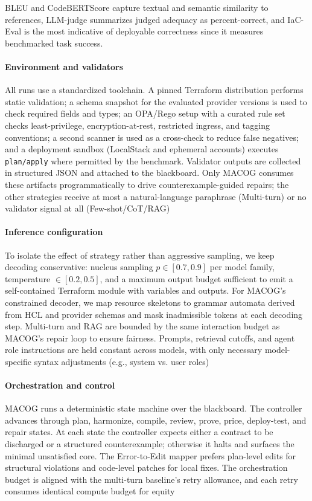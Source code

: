 \documentclass[manuscript,screen,nonacm]{acmart}
\begin{document}
BLEU and CodeBERTScore capture textual and semantic similarity to references, LLM-judge summarizes judged adequacy as percent-correct, and IaC-Eval is the most indicative of deployable correctness since it measures benchmarked task success.


\paragraph{Environment and validators}
All runs use a standardized toolchain. A pinned Terraform distribution performs static validation; a schema snapshot for the evaluated provider versions is used to check required fields and types; an OPA/Rego setup with a curated rule set checks least-privilege, encryption-at-rest, restricted ingress, and tagging conventions; a second scanner is used as a cross-check to reduce false negatives; and a deployment sandbox (LocalStack and ephemeral accounts) executes \texttt{plan/apply} where permitted by the benchmark. Validator outputs are collected in structured JSON and attached to the blackboard. Only MACOG consumes these artifacts programmatically to drive counterexample-guided repairs; the other strategies receive at most a natural-language paraphrase (Multi-turn) or no validator signal at all (Few-shot/CoT/RAG)

\paragraph{Inference configuration}
To isolate the effect of strategy rather than aggressive sampling, we keep decoding conservative: nucleus sampling $p \in [0.7,0.9]$ per model family, temperature $\in [0.2,0.5]$, and a maximum output budget sufficient to emit a self-contained Terraform module with variables and outputs. For MACOG’s constrained decoder, we map resource skeletons to grammar automata derived from HCL and provider schemas and mask inadmissible tokens at each decoding step. Multi-turn and RAG are bounded by the same interaction budget as MACOG’s repair loop to ensure fairness. Prompts, retrieval cutoffs, and agent role instructions are held constant across models, with only necessary model-specific syntax adjustments (e.g., system vs. user roles)

\paragraph{Orchestration and control}
MACOG runs a deterministic state machine over the blackboard. The controller advances through plan, harmonize, compile, review, prove, price, deploy-test, and repair states. At each state the controller expects either a contract to be discharged or a structured counterexample; otherwise it halts and surfaces the minimal unsatisfied core. The Error-to-Edit mapper prefers plan-level edits for structural violations and code-level patches for local fixes. The orchestration budget is aligned with the multi-turn baseline’s retry allowance, and each retry consumes identical compute budget for equity
\end{document}
